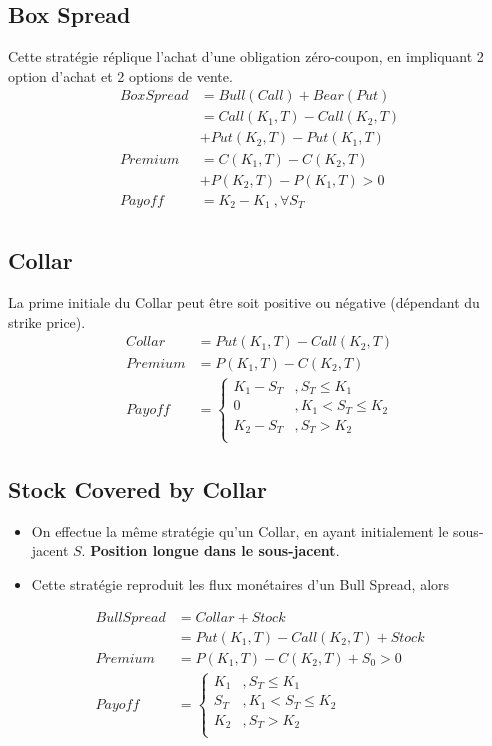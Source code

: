 \documentclass[10pt, french]{article}
\begin{document}
\begin{multicols*}{2}
\subsection*{Box Spread}
Cette stratégie réplique l'achat d'une obligation zéro-coupon, en impliquant 2 option d'achat et 2 options de vente.
\begin{align*}
Box Spread			& = Bull(Call) + Bear(Put) \\
& = Call(K_1, T) - Call(K_2, T)  \\
& + Put(K_2, T) - Put(K_1, T) \\
Premium				& = C(K_1, T) - C(K_2, T) \\
							&  + P(K_2, T) - P(K_1,T) >  0 \\
Payoff					& = K_2 - K_1  \ , \forall S_T \\
\end{align*}



\subsection*{Collar}
La prime initiale du Collar peut être soit positive ou négative (dépendant du strike price).
\begin{align*}
Collar				& = Put(K_1, T) - Call(K_2, T) \\
Premium			& = P(K_1, T) - C(K_2,T) \\
Payoff				& =
\begin{cases}
K_1 - S_T			& , S_T \leq K_1 \\
0						& , K_1 < S_T \leq K_2 \\
K_2 - S_T			& , S_T > K_2 \\
\end{cases}
\end{align*}



\subsection*{Stock Covered by Collar}
\begin{itemize}
\item On effectue la même stratégie qu'un Collar, en ayant initialement le sous-jacent $S$. \textbf{Position longue dans le sous-jacent}.
\item Cette stratégie reproduit les flux monétaires d'un Bull Spread, alors
\end{itemize}
\begin{align*}
BullSpread				& = Collar + Stock \\
								& = Put(K_1, T) - Call(K_2, T) + Stock \\
Premium					& = P(K_1, T) - C(K_2,T) + S_0 > 0  \\
Payoff						& =
\begin{cases}
K_1 					& , S_T \leq K_1 \\
S_T					& , K_1 < S_T \leq K_2 \\
K_2 					& , S_T > K_2 \\
\end{cases}
\end{align*}




\end{multicols*}
\end{document}
